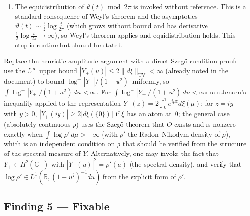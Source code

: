 \documentclass[11pt]{article}
\newcommand{\R}{\mathbb{R}}
\newcommand{\C}{\mathbb{C}}
\begin{document}
\begin{description}[leftmargin=0pt]
\begin{enumerate}
\item The equidistribution of $\vartheta(t)\bmod 2\pi$ is invoked without
reference. This is a standard consequence of Weyl's theorem and the asymptotics
$\vartheta(t)\sim\frac{t}{2}\log\frac{t}{2\pi}$ (which grows without bound and
has derivative $\frac{1}{2}\log\frac{t}{2\pi}\to\infty$), so Weyl's theorem
applies and equidistribution holds. This step is routine but should be stated.
\end{enumerate}

\item[What would establish it:]
Replace the heuristic amplitude argument with a direct Szeg\H{o}-condition proof:
use the $L^\infty$ upper bound $|Y_+(u)|\le 2\|d\xi\|_{\mathrm{TV}}<\infty$
(already noted in the document) to bound $\log^+|Y_+|/(1+u^2)$ uniformly, so
$\int\log^+|Y_+|/(1+u^2)\,du<\infty$.
For $\int\log^-|Y_+|/(1+u^2)\,du<\infty$: use Jensen's inequality applied to
the representation $Y_+(z)=2\int_0^1 e^{i\mu z}d\xi(\mu)$; for $z=iy$ with
$y>0$, $|Y_+(iy)|\ge 2|d\xi(\{0\})|$ if $\xi$ has an atom at~$0$; the general
case (absolutely continuous $\rho$) uses the Szeg\H{o} theorem that $O$ exists
and is nonzero exactly when $\int\log\rho'\,d\mu>-\infty$ (with $\rho'$ the
Radon--Nikodym density of $\rho$), which is an independent condition on $\rho$
that should be verified from the structure of the spectral measure of $Y$.
Alternatively, one may invoke the fact that $Y_+\in H^2(\C^+)$ with
$|Y_+(u)|^2=\rho'(u)$ (the spectral density), and verify that
$\log\rho'\in L^1(\R,(1+u^2)^{-1}du)$ from the explicit form of $\rho'$.
\end{description}

\subsection*{Finding 5 — Fixable}
\end{document}
